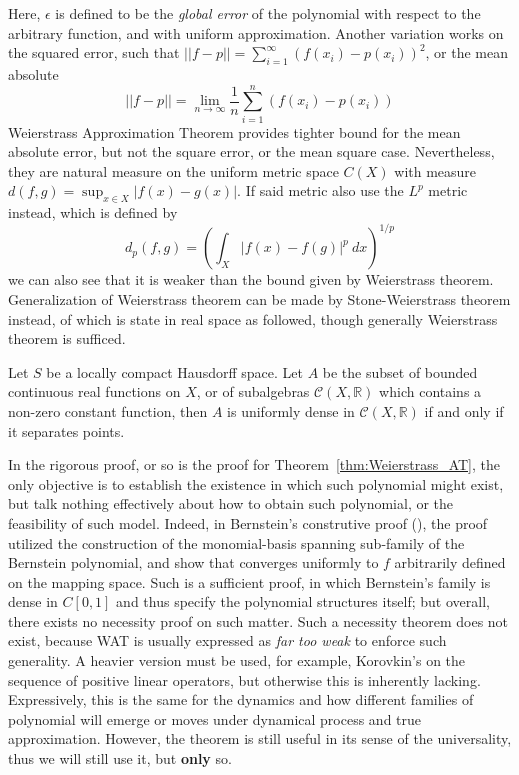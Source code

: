 \documentclass[
  journal=largetwo,
  year=2025,
  volume=37,
]{cup-journal}
\begin{document}
Here, $\epsilon$ is defined to be the \textit{global error} of the polynomial with respect to the arbitrary function, and with uniform approximation. Another variation works on the squared error, such that $||f-p||=\sum_{i=1}^{\infty}(f(x_{i})-p(x_{i}))^{2}$, or the mean absolute $$||f-p||=\lim_{n\to\infty}\frac{1}{n}\sum_{i=1}^{n}(f(x_{i})-p(x_{i}))$$
Weierstrass Approximation Theorem provides tighter bound for the mean absolute error, but not the square error, or the mean square case. Nevertheless, they are natural measure on the uniform metric space $C(X)$ with measure $d(f,g)=\sup_{x\in X}|f(x)-g(x)|$. If said metric also use the $L^{p}$ metric instead, which is defined by 
\begin{equation}
    d_{p}(f,g) = \left(\int_{X}|f(x)-f(g)|^{p}\:dx\right)^{1/p}
\end{equation}
we can also see that it is weaker than the bound given by Weierstrass theorem. Generalization of Weierstrass theorem can be made by Stone-Weierstrass theorem instead, of which is state in real space as followed, though generally Weierstrass theorem is sufficed.
\begin{theorem}
  Let $S$ be a locally compact Hausdorff space. Let $A$ be the subset of bounded continuous real functions on $X$, or of subalgebras $\mathcal{C}(X,\mathbb{R})$ which contains a non-zero constant function, then $A$ is uniformly dense in $\mathcal{C}(X,\mathbb{R})$ if and only if it separates points. 
\end{theorem}

In the rigorous proof, or so is the proof for Theorem~\ref{thm:Weierstrass_AT}, the only objective is to establish the existence in which such polynomial might exist, but talk nothing effectively about how to obtain such polynomial, or the feasibility of such model. Indeed, in Bernstein's construtive proof (\cite{sury2019weierstrass,bernsprob2023}), the proof utilized the construction of the monomial-basis spanning sub-family of the Bernstein polynomial, and show that converges uniformly to $f$ arbitrarily defined on the mapping space. Such is a sufficient proof, in which Bernstein's family is dense in $C[0,1]$ and thus specify the polynomial structures itself; but overall, there exists no necessity proof on such matter. Such a necessity theorem does not exist, because WAT is usually expressed as \textit{far too weak} to enforce such generality. A heavier version must be used, for example, Korovkin's on the sequence of positive linear operators, but otherwise this is inherently lacking. Expressively, this is the same for the dynamics and how different families of polynomial will emerge or moves under dynamical process and true approximation. However, the theorem is still useful in its sense of the universality, thus we will still use it, but \textbf{only} so. 
\end{document}
